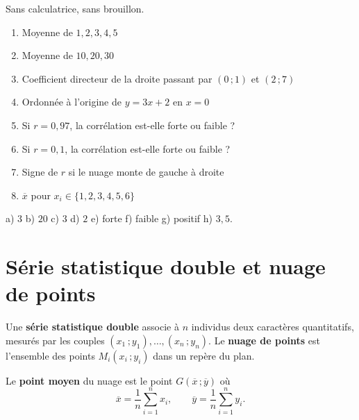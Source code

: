 \begin{automatismes}
Sans calculatrice, sans brouillon.

\begin{enumerate}[label=\textbf{\alph*)}, leftmargin=*, itemsep=0.25em]
  \item Moyenne de $1,2,3,4,5$
  \item Moyenne de $10,20,30$
  \item Coefficient directeur de la droite passant par $(0\,;1)$ et $(2\,;7)$
  \item Ordonnée à l'origine de $y = 3x+2$ en $x = 0$
  \item Si $r = 0{,}97$, la corrélation est-elle forte ou faible ?
  \item Si $r = 0{,}1$, la corrélation est-elle forte ou faible ?
  \item Signe de $r$ si le nuage monte de gauche à droite
  \item $\overline{x}$ pour $x_{i} \in \{1,2,3,4,5,6\}$
\end{enumerate}
\end{automatismes}

\begin{corrige}[automatismes]
a) $3$ \quad b) $20$ \quad c) $3$ \quad d) $2$ \quad e) forte \quad
f) faible \quad g) positif \quad h) $3{,}5$.
\end{corrige}

\section{Série statistique double et nuage de points}

\begin{definition}
Une \textbf{série statistique double} associe à $n$ individus deux
caractères quantitatifs, mesurés par les couples
$\left(x_{1}\,;y_{1}\right),\dots,\left(x_{n}\,;y_{n}\right)$. Le
\textbf{nuage de points} est l'ensemble des points $M_{i}\left(x_{i}\,;
y_{i}\right)$ dans un repère du plan.
\end{definition}

\begin{definition}
Le \textbf{point moyen} du nuage est le point $G\left(\overline{x}\,;
\overline{y}\right)$ où
\[
  \overline{x} = \frac{1}{n}\sum_{i=1}^{n}x_{i},
  \qquad
  \overline{y} = \frac{1}{n}\sum_{i=1}^{n}y_{i} .
\]
\end{definition}

